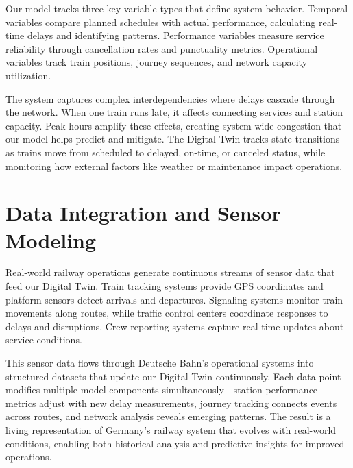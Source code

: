 \documentclass{article}
\begin{document}
Our model tracks three key variable types that define system behavior. Temporal variables compare planned schedules with actual performance, calculating real-time delays and identifying patterns. Performance variables measure service reliability through cancellation rates and punctuality metrics. Operational variables track train positions, journey sequences, and network capacity utilization.

The system captures complex interdependencies where delays cascade through the network. When one train runs late, it affects connecting services and station capacity. Peak hours amplify these effects, creating system-wide congestion that our model helps predict and mitigate. The Digital Twin tracks state transitions as trains move from scheduled to delayed, on-time, or canceled status, while monitoring how external factors like weather or maintenance impact operations.

\section{Data Integration and Sensor Modeling}

Real-world railway operations generate continuous streams of sensor data that feed our Digital Twin. Train tracking systems provide GPS coordinates and platform sensors detect arrivals and departures. Signaling systems monitor train movements along routes, while traffic control centers coordinate responses to delays and disruptions. Crew reporting systems capture real-time updates about service conditions.

This sensor data flows through Deutsche Bahn's operational systems into structured datasets that update our Digital Twin continuously. Each data point modifies multiple model components simultaneously - station performance metrics adjust with new delay measurements, journey tracking connects events across routes, and network analysis reveals emerging patterns. The result is a living representation of Germany's railway system that evolves with real-world conditions, enabling both historical analysis and predictive insights for improved operations.
\end{document}
